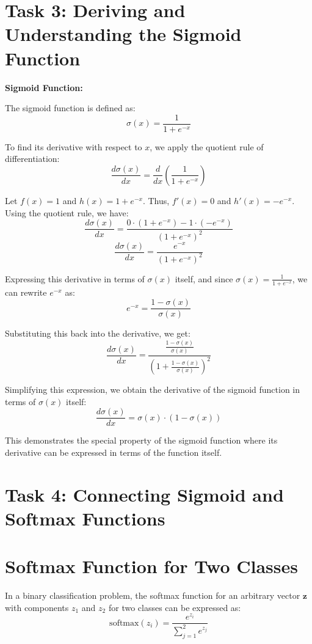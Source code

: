 \documentclass[10pt]{article}
\title{}
\author{$\textbf{American University of Armenia}$ \\
\textbf{Spring 2023}\\
\textbf{Generative AI (DS 235)}\\
\textbf{Homework 1 Part2}\\
\textbf{Tigran Gaplanyan}}
\date{}
\begin{document}
\maketitle

\section*{\textbf{Task 3}: Deriving and Understanding the Sigmoid Function}

\textbf{Sigmoid Function:}

The sigmoid function is defined as:
\[ \sigma(x) = \frac{1}{1 + e^{-x}} \]

To find its derivative with respect to \( x \), we apply the quotient rule of differentiation:
\[ \frac{d\sigma(x)}{dx} = \frac{d}{dx} \left( \frac{1}{1 + e^{-x}} \right) \]

Let \( f(x) = 1 \) and \( h(x) = 1 + e^{-x} \). Thus, \( f'(x) = 0 \) and \( h'(x) = -e^{-x} \). Using the quotient rule, we have:
\[ \frac{d\sigma(x)}{dx} = \frac{0 \cdot (1 + e^{-x}) - 1 \cdot (-e^{-x})}{(1 + e^{-x})^2} \]
\[ \frac{d\sigma(x)}{dx} = \frac{e^{-x}}{(1 + e^{-x})^2} \]

Expressing this derivative in terms of \( \sigma(x) \) itself, and since \( \sigma(x) = \frac{1}{1 + e^{-x}} \), we can rewrite \( e^{-x} \) as:
\[ e^{-x} = \frac{1 - \sigma(x)}{\sigma(x)} \]

Substituting this back into the derivative, we get:
\[ \frac{d\sigma(x)}{dx} = \frac{\frac{1 - \sigma(x)}{\sigma(x)}}{(1 + \frac{1 - \sigma(x)}{\sigma(x)})^2} \]

Simplifying this expression, we obtain the derivative of the sigmoid function in terms of \( \sigma(x) \) itself:
\[ \frac{d\sigma(x)}{dx} = \sigma(x) \cdot (1 - \sigma(x)) \]

This demonstrates the special property of the sigmoid function where its derivative can be expressed in terms of the function itself.

\section*{\textbf{Task 4}: Connecting Sigmoid and Softmax Functions}

\section*{Softmax Function for Two Classes}
In a binary classification problem, the softmax function for an arbitrary vector \( \mathbf{z} \) with components \( z_1 \) and \( z_2 \) for two classes can be expressed as:
\[ \text{softmax}(z_i) = \frac{e^{z_i}}{\sum_{j=1}^{2} e^{z_j}} \]
\end{document}
